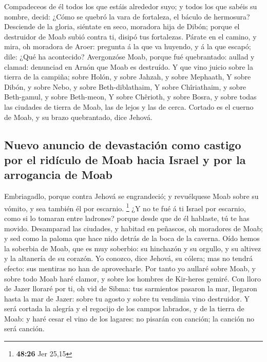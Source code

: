  Compadeceos de él todos los que estáis alrededor suyo; y
todos los que sabéis su nombre, decid: ¿Cómo se quebró la vara de
fortaleza, el báculo de hermosura?  Desciende de la
gloria, siéntate en seco, moradora hija de Dibón; porque el destruidor
de Moab subió contra ti, disipó tus fortalezas.  Párate
en el camino, y mira, oh moradora de Aroer: pregunta á la que va
huyendo, y á la que escapó; dile: ¿Qué ha acontecido? 
Avergonzóse Moab, porque fué quebrantado: aullad y clamad: denunciad en
Arnón que Moab es destruído.  Y que vino juicio sobre la
tierra de la campiña; sobre Holón, y sobre Jahzah, y sobre Mephaath,
 Y sobre Dibón, y sobre Nebo, y sobre Beth-diblathaim,
 Y sobre Chîriathaim, y sobre Beth-gamul, y sobre
Beth-meon,  Y sobre Chêrioth, y sobre Bosra, y sobre
todas las ciudades de tierra de Moab, las de lejos y las de cerca.
 Cortado es el cuerno de Moab, y su brazo quebrantado,
dice Jehová.

\hypertarget{nuevo-anuncio-de-devastaciuxf3n-como-castigo-por-el-riduxedculo-de-moab-hacia-israel-y-por-la-arrogancia-de-moab}{%
\subsection{Nuevo anuncio de devastación como castigo por el ridículo de
Moab hacia Israel y por la arrogancia de
Moab}\label{nuevo-anuncio-de-devastaciuxf3n-como-castigo-por-el-riduxedculo-de-moab-hacia-israel-y-por-la-arrogancia-de-moab}}

 Embriagadlo, porque contra Jehová se engrandeció; y
revuélquese Moab sobre su vómito, y sea también él por escarnio.
\footnote{\textbf{48:26} Jer 25,15}  ¿Y no te fué á ti
Israel por escarnio, como si lo tomaran entre ladrones? porque desde que
de él hablaste, tú te has movido.  Desamparad las
ciudades, y habitad en peñascos, oh moradores de Moab; y sed como la
paloma que hace nido detrás de la boca de la caverna. 
Oído hemos la soberbia de Moab, que es muy soberbio: su hinchazón y su
orgullo, y su altivez y la altanería de su corazón.  Yo
conozco, dice Jehová, su cólera; mas no tendrá efecto: sus mentiras no
han de aprovecharle.  Por tanto yo aullaré sobre Moab, y
sobre todo Moab haré clamor, y sobre los hombres de Kir-heres gemiré.
 Con lloro de Jazer lloraré por ti, oh vid de Sibma: tus
sarmientos pasaron la mar, llegaron hasta la mar de Jazer: sobre tu
agosto y sobre tu vendimia vino destruidor.  Y será
cortada la alegría y el regocijo de los campos labrados, y de la tierra
de Moab: y haré cesar el vino de los lagares: no pisarán con canción; la
canción no será canción.

